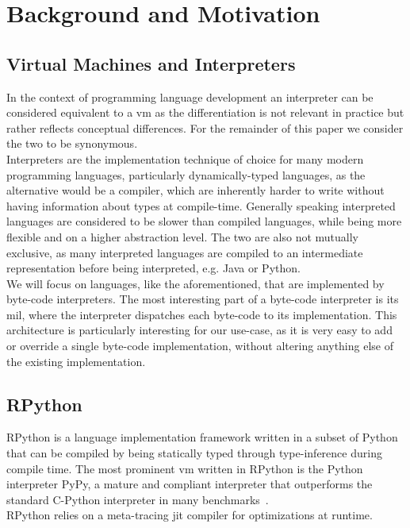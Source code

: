 \documentclass[preprint, nonatbib]{sigplanconf}
\begin{document}



\section{Background and Motivation}
\subsection{Virtual Machines and Interpreters}
In the context of programming language development an interpreter can be considered equivalent to a \gls{vm} as the differentiation is not relevant in practice but rather reflects conceptual differences. For the remainder of this paper we consider the two to be synonymous.\\
Interpreters are the implementation technique of choice for many modern programming languages, particularly dynamically-typed languages, as the alternative would be a compiler, which are inherently harder to write without having information about types at compile-time. Generally speaking interpreted languages are considered to be slower than compiled languages, while being more flexible and on a higher abstraction level. The two are also not mutually exclusive, as many interpreted languages are compiled to an intermediate representation before being interpreted, e.g. Java or Python. \\
We will focus on languages, like the aforementioned, that are implemented by byte-code interpreters. The most interesting part of a byte-code interpreter is its \gls{mil}, where the interpreter dispatches each byte-code to its implementation. This architecture is particularly interesting for our use-case, as it is very easy to add or override a single byte-code implementation, without altering anything else of the existing implementation.

\subsection{RPython}
RPython is a language implementation framework written in a subset of Python that can be compiled by being statically typed through type-inference during compile time. The most prominent \gls{vm} written in RPython is the Python interpreter PyPy, a mature and compliant interpreter that outperforms the standard C-Python interpreter in many benchmarks~\cite{pypy2017speed}.\\
RPython relies on a meta-tracing \gls{jit} compiler for optimizations at runtime.
\end{document}
